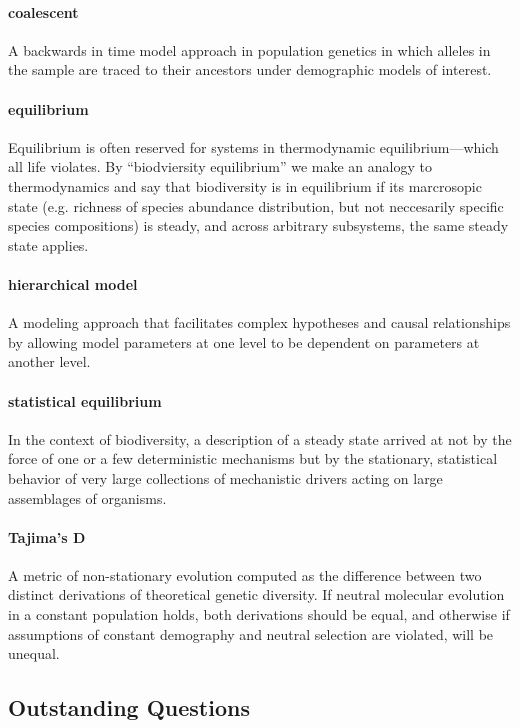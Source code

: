 \documentclass[12pt]{article}
\begin{document}
\paragraph{coalescent} A backwards in time model approach in
population genetics in which alleles in the sample are traced to their
ancestors under demographic models of interest.

\paragraph{equilibrium} Equilibrium is often reserved for systems in
thermodynamic equilibrium---which all life violates.  By
``biodviersity equilibrium'' we make an analogy to thermodynamics and
say that biodiversity is in equilibrium if its marcrosopic state
(e.g. richness of species abundance distribution, but not neccesarily
specific species compositions) is steady, and across arbitrary
subsystems, the same steady state applies.

\paragraph{hierarchical model} A modeling approach that facilitates
complex hypotheses and causal relationships by allowing model
parameters at one level to be dependent on parameters at another
level.

\paragraph{statistical equilibrium} In the context of biodiversity, a
description of a steady state arrived at not by the force of one or a
few deterministic mechanisms but by the stationary, statistical
behavior of very large collections of mechanistic drivers acting on
large assemblages of organisms.

\paragraph{Tajima's D} A metric of non-stationary evolution computed
as the difference between two distinct derivations of theoretical
genetic diversity. If neutral molecular evolution in a constant
population holds, both derivations should be equal, and otherwise if
assumptions of constant demography and neutral selection are violated,
will be unequal.

\subsection*{Outstanding Questions}
\end{document}

